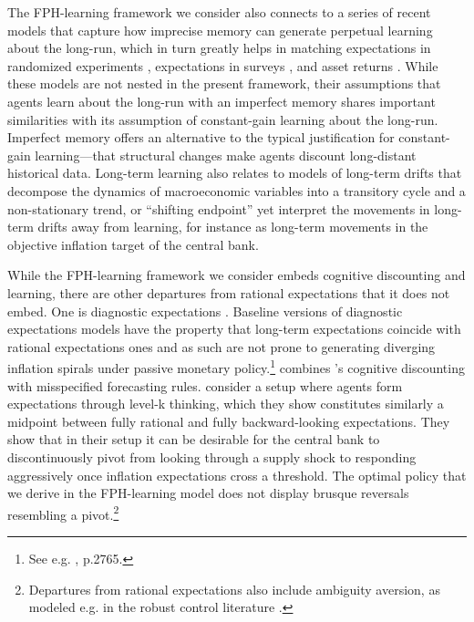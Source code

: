 \documentclass{article}
\begin{document}
The FPH-learning framework we consider also connects to a series of recent models that capture how imprecise memory can generate perpetual learning about the long-run, which in turn greatly helps in matching expectations in randomized experiments \citep{Afrouzietal2023,Azeredoetal2020}, expectations in surveys \citep{Sung2022}, and asset returns \cite{NagelXu2022}. While these models are not nested in the present framework, their assumptions that agents learn about the long-run with an imperfect memory shares important similarities with its assumption of constant-gain learning about the long-run. Imperfect memory offers an alternative to the typical justification for constant-gain learning---that structural changes make agents discount long-distant historical data. Long-term learning also relates to models of long-term drifts that decompose the dynamics of macroeconomic variables into a transitory cycle and a non-stationary trend, or ``shifting endpoint'' \cite[e.g.][]{KozickiTinsley2001,GSS2005sensitivity} yet interpret the movements in long-term drifts away from learning, for instance as long-term movements in the objective inflation target of the central bank.

While the FPH-learning framework we consider embeds cognitive discounting and learning, there are other departures from rational expectations that it does not embed. One is diagnostic expectations \citep{Bordaloetal2018,Bordaloetal2019,Bordaloetal2020,Lhuillieretal2023}. Baseline versions of diagnostic expectations models have the property that long-term expectations coincide with rational expectations ones and as such are not prone to generating diverging inflation spirals under passive monetary policy.\footnote{See e.g. \cite{Bordaloetal2020}, p.2765.} \cite{Hadjini2022} combines \cite{Gabaix2020}'s cognitive discounting with misspecified forecasting rules. \cite{Beaudryetal2023} consider a setup where agents form expectations through level-k thinking, which they show constitutes similarly a midpoint between fully rational and fully backward-looking expectations. They show that in their setup it can be desirable for the central bank to discontinuously pivot from looking through a supply shock to responding aggressively once inflation expectations cross a threshold. The optimal policy that we derive in the FPH-learning model does not display brusque reversals resembling a pivot.\footnote{Departures from rational expectations also include ambiguity aversion, as modeled e.g. in the robust control literature \cite{Robustness}.}
\end{document}
